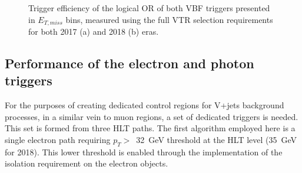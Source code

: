 \begin{figure}[htbp]
  \centering
  \caption{Trigger efficiency of the logical OR of both VBF triggers presented in $E_{T,miss}$ bins, measured using the full VTR selection requirements for both 2017 (a) and 2018 (b) eras.}
  \label{fig:vbf_trig_eff_final}
\end{figure}

\subsection{Performance of the electron and photon triggers}
\hspace{10pt} For the purposes of creating dedicated control regions for V+jets background processes, in a similar vein to muon regions, a set of dedicated triggers is needed. This set is formed from three HLT paths. The first algorithm employed here is a single electron path requiring $p_T>$~32~GeV threshold at the HLT level (35~GeV for 2018). This lower threshold is enabled through the implementation of the isolation requirement on the electron objects.


